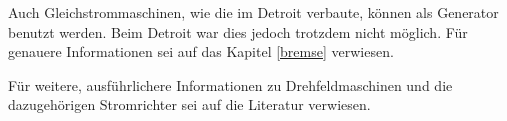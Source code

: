 Auch Gleichstrommaschinen, wie die im Detroit verbaute, können als Generator benutzt werden. Beim Detroit war dies jedoch trotzdem nicht möglich. Für genauere Informationen sei auf das Kapitel \ref{bremse} verwiesen.

Für weitere, ausführlichere Informationen zu Drehfeldmaschinen und die dazugehörigen Stromrichter sei auf die Literatur \cite{elektrischeantriebe} verwiesen.

\newpage